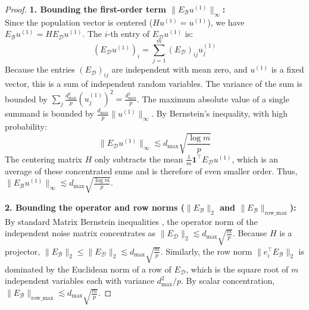 \documentclass[11pt]{article}
\begin{document}
\begin{proof}
\textbf{1. Bounding the first-order term $\|E_{\mathcal{B}} u^{(1)}\|_\infty$:} \\
Since the population vector is centered ($H u^{(1)} = u^{(1)}$), we have $E_{\mathcal{B}} u^{(1)} = H E_{\mathcal{D}} u^{(1)}$. The $i$-th entry of $E_{\mathcal{D}} u^{(1)}$ is:
\begin{equation}
(E_{\mathcal{D}} u^{(1)})_i = \sum_{j=1}^m (E_{\mathcal{D}})_{ij} u^{(1)}_j
\end{equation}
Because the entries $(E_{\mathcal{D}})_{ij}$ are independent with mean zero, and $u^{(1)}$ is a fixed vector, this is a sum of independent random variables. The variance of the sum is bounded by $\sum_j \frac{d_{\max}^2}{p} (u^{(1)}_j)^2 = \frac{d_{\max}^2}{p}$. The maximum absolute value of a single summand is bounded by $\frac{d_{\max}}{p} \|u^{(1)}\|_\infty$. By Bernstein's inequality, with high probability:
\begin{equation}
\|E_{\mathcal{D}} u^{(1)}\|_\infty \lesssim d_{\max} \sqrt{\frac{\log m}{p}}
\end{equation}
The centering matrix $H$ only subtracts the mean $\frac{1}{m}\mathbf{1}^\top E_{\mathcal{D}} u^{(1)}$, which is an average of these concentrated sums and is therefore of even smaller order. Thus, $\|E_{\mathcal{B}} u^{(1)}\|_\infty \lesssim d_{\max} \sqrt{\frac{\log m}{p}}$.

\textbf{2. Bounding the operator and row norms ($\|E_{\mathcal{B}}\|_2$ and $\|E_{\mathcal{B}}\|_{\text{row\_max}}$):} \\
By standard Matrix Bernstein inequalities \cite{tropp2012}, the operator norm of the independent noise matrix concentrates as $\|E_{\mathcal{D}}\|_2 \lesssim d_{\max} \sqrt{\frac{m}{p}}$. Because $H$ is a projector, $\|E_{\mathcal{B}}\|_2 \le \|E_{\mathcal{D}}\|_2 \lesssim d_{\max} \sqrt{\frac{m}{p}}$. 
Similarly, the row norm $\|e_i^\top E_{\mathcal{B}}\|_2$ is dominated by the Euclidean norm of a row of $E_{\mathcal{D}}$, which is the square root of $m$ independent variables each with variance $d_{\max}^2/p$. By scalar concentration, $\|E_{\mathcal{B}}\|_{\text{row\_max}} \lesssim d_{\max} \sqrt{\frac{m}{p}}$.


\end{proof}
\end{document}
